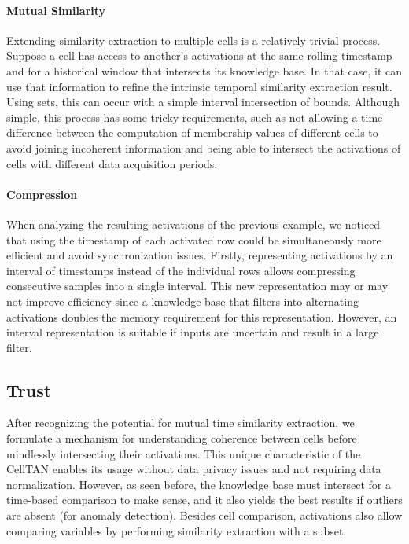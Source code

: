 \paragraph{Mutual Similarity}

Extending similarity extraction to multiple cells is a relatively trivial process. Suppose a cell has access to another's activations at the same rolling timestamp and for a historical window that intersects its knowledge base. In that case, it can use that information to refine the intrinsic temporal similarity extraction result. Using sets, this can occur with a simple interval intersection of bounds. Although simple, this process has some tricky requirements, such as not allowing a time difference between the computation of membership values of different cells to avoid joining incoherent information and being able to intersect the activations of cells with different data acquisition periods.

\paragraph{Compression}

When analyzing the resulting activations of the previous example, we noticed that using the timestamp of each activated row could be simultaneously more efficient and avoid synchronization issues. Firstly, representing activations by an interval of timestamps instead of the individual rows allows compressing consecutive samples into a single interval.
This new representation may or may not improve efficiency since a knowledge base that filters into alternating activations doubles the memory requirement for this representation. However, an interval representation is suitable if inputs are uncertain and result in a large filter.



\subsection{Trust}  \label{subsec:trust}


After recognizing the potential for mutual time similarity extraction, we formulate a mechanism for understanding coherence between cells before mindlessly intersecting their activations. This unique characteristic of the CellTAN enables its usage without data privacy issues and not requiring data normalization. However, as seen before, the knowledge base must intersect for a time-based comparison to make sense, and it also yields the best results if outliers are absent (for anomaly detection). Besides cell comparison, activations also allow comparing variables by performing similarity extraction with a subset.

